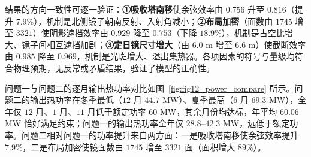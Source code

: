 \documentclass[12pt]{ctexart}
\begin{document}
\begin{table}[H]
\centering
{}
\caption{问题二每月 $21$ 日平均光学效率及输出功率}
\label{tab:p2_monthly}
\end{table}

结果的方向一致性可逐一验证：\textbf{①吸收塔南移}使余弦效率由 $0.756$ 升至 $0.816$（提升 $7.9\%$），机制是北侧镜子朝南反射、入射角减小；\textbf{②布局加密}（面数由 $1745$ 增至 $3321$）使阴影遮挡效率由 $0.929$ 降至 $0.753$（下降 $18.9\%$），机制是占空比增大、镜子间相互遮挡加剧；\textbf{③定日镜尺寸增大}（由 $6.0$ m 增至 $6.6$ m）使截断效率由 $0.985$ 降至 $0.969$，机制是光斑增大、溢出集热器。各项因素的符号与量级均符合物理预期，无反常或矛盾结果，验证了模型的正确性。

问题一与问题二的逐月输出热功率对比如图~\ref{fig:fig12_power_compare} 所示。问题二的输出热功率在冬季最低（$12$ 月 $44.7$ MW）、夏季最高（$6$ 月 $69.3$ MW），全年仅 $12$ 月、$1$ 月、$11$ 月低于额定功率 $60$ MW，其余月份均达标，年平均 $60.06$ MW 恰好满足约束；问题一的输出热功率全年仅 $28.8$--$42.3$ MW，远低于额定功率。问题二相对问题一的功率提升来自两方面：一是吸收塔南移使余弦效率提升 $7.9\%$，二是布局加密使镜面数由 $1745$ 增至 $3321$ 面（面积增大 $89\%$）。
\end{document}
